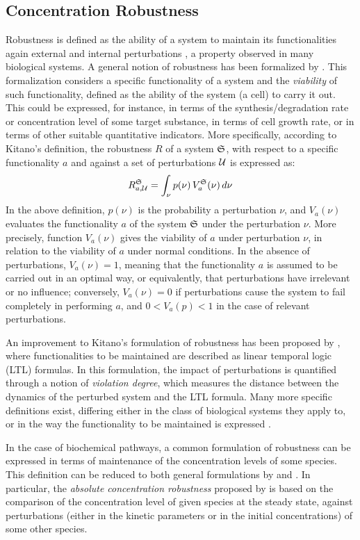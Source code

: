 \subsection{Concentration Robustness}\label{sec:robustness}
Robustness is defined as the ability of a system to maintain its functionalities again external and internal perturbations \citep{kitano2004biological}, a property observed in many biological systems. A general notion of robustness has been formalized by \citet{kitano2007towards}. This formalization considers a specific functionality of a system and the \emph{viability} of such functionality, defined as the ability of the system (\eg a cell) to carry it out. This could be expressed, for instance, in terms of the synthesis/degradation rate or concentration level of some target substance, in terms of cell growth rate, or in terms of  other suitable quantitative indicators. More specifically, according to Kitano's definition, the robustness $R$ of a system $\mathfrak{S}$, with respect to a specific functionality $a$ and against a set of perturbations $\Cal{U}$ is expressed as:
\[
 R^{\System}_{a,\Cal{U}} = \int_{\nu} p(\nu)\, V_a^{\System}(\nu)\,d\nu
\]
In the above definition, $p(\nu)$ is the probability a perturbation $\nu$, and $V_a(\nu)$ evaluates the functionality $a$ of the system $\mathfrak{S}$ under the perturbation $\nu$. More precisely, function $V_a(\nu)$ gives the viability of $a$ under perturbation $\nu$, in relation to the viability of $a$ under normal conditions. In the absence of perturbations, $V_a(\nu)=1$, meaning that the functionality $a$ is assumed to be carried out in an optimal way, or equivalently, that perturbations have irrelevant or no influence; conversely, $V_a(\nu) = 0$ if perturbations cause the system to fail completely in performing $a$, and $0 < V_a(p) < 1$ in the case of relevant perturbations.

An improvement to Kitano's formulation of robustness has been proposed by \citet{rizk2009general}, where functionalities to be maintained are described as linear temporal logic (LTL) formulas. In this formulation, the impact of perturbations is quantified through a notion of \emph{violation degree}, which measures the distance between the dynamics of the perturbed system and the LTL formula. Many more specific definitions exist, differing either in the class of biological systems they apply to, or in the way the functionality to be maintained is expressed \citep{larhlimi2011robustness}.

In the case of biochemical pathways, a common formulation of robustness can be expressed in terms of maintenance of the concentration levels of some species. This definition can be reduced to both general formulations by \citet{kitano2007towards} and \citet{rizk2009general}. In particular, the \emph{absolute concentration robustness} proposed by \citet{shinar2010structural} is based on the comparison of the concentration level of given species at the steady state, against perturbations (either in the kinetic parameters or in the initial concentrations) of some other species.

